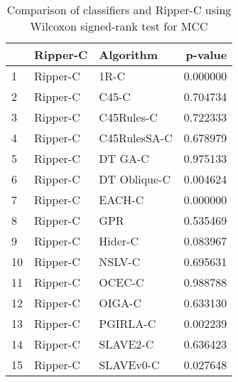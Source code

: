 \begin{table}
\footnotesize
\caption{Comparison of classifiers and Ripper-C using Wilcoxon signed-rank test for MCC}
\label{tab:Ripper-C wilcoxon MCC comparison}
\begin{tabular}{lllr}
\hline
 & Ripper-C & Algorithm & p-value \\
\hline
1 & Ripper-C & 1R-C & 0.000000 \\
2 & Ripper-C & C45-C & 0.704734 \\
3 & Ripper-C & C45Rules-C & 0.722333 \\
4 & Ripper-C & C45RulesSA-C & 0.678979 \\
5 & Ripper-C & DT GA-C & 0.975133 \\
6 & Ripper-C & DT Oblique-C & 0.004624 \\
7 & Ripper-C & EACH-C & 0.000000 \\
8 & Ripper-C & GPR & 0.535469 \\
9 & Ripper-C & Hider-C & 0.083967 \\
10 & Ripper-C & NSLV-C & 0.695631 \\
11 & Ripper-C & OCEC-C & 0.988788 \\
12 & Ripper-C & OIGA-C & 0.633130 \\
13 & Ripper-C & PGIRLA-C & 0.002239 \\
14 & Ripper-C & SLAVE2-C & 0.636423 \\
15 & Ripper-C & SLAVEv0-C & 0.027648 \\
\hline
\end{tabular}
\end{table}
